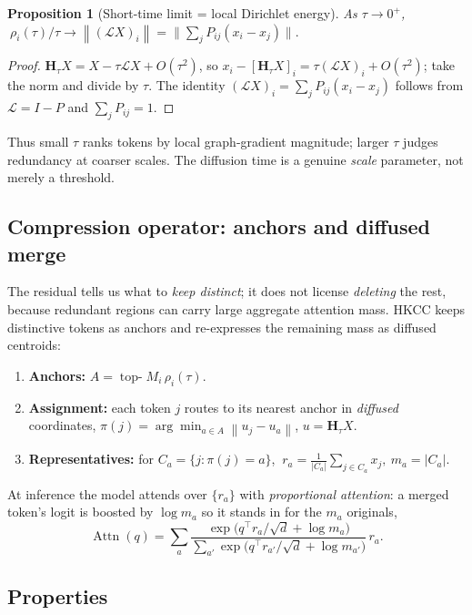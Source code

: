 \documentclass[11pt]{article}
\newtheorem{proposition}{Proposition}
\newcommand{\rwL}{\mathcal{L}}
\newcommand{\Hop}{\mathbf{H}}
\newcommand{\norm}[1]{\left\lVert#1\right\rVert}
\begin{document}
\begin{proposition}[Short-time limit = local Dirichlet energy]
\label{prop:shorttime}
As $\tau\to 0^+$, $\ \rho_i(\tau)/\tau \to \norm{(\rwL X)_i} = \big\lVert\sum_j P_{ij}(x_i-x_j)\big\rVert.$
\end{proposition}
\begin{proof}
$\Hop_\tau X = X-\tau\rwL X+O(\tau^2)$, so $x_i-[\Hop_\tau X]_i=\tau(\rwL X)_i+O(\tau^2)$;
take the norm and divide by $\tau$. The identity $(\rwL X)_i=\sum_j P_{ij}(x_i-x_j)$ follows from
$\rwL=I-P$ and $\sum_jP_{ij}=1$.
\end{proof}
\noindent
Thus small $\tau$ ranks tokens by local graph-gradient magnitude; larger $\tau$ judges redundancy
at coarser scales. The diffusion time is a genuine \emph{scale} parameter, not merely a threshold.

\subsection{Compression operator: anchors and diffused merge}
\label{sec:op}
The residual tells us what to \emph{keep distinct}; it does not license \emph{deleting} the rest,
because redundant regions can carry large aggregate attention mass. HKCC keeps distinctive tokens
as anchors and re-expresses the remaining mass as diffused centroids:
\begin{enumerate}
\item \textbf{Anchors:} $A=\operatorname{top\text{-}}M_i\,\rho_i(\tau)$.
\item \textbf{Assignment:} each token $j$ routes to its nearest anchor in \emph{diffused}
coordinates, $\pi(j)=\arg\min_{a\in A}\norm{u_j-u_a}$, $u=\Hop_\tau X$.
\item \textbf{Representatives:} for $C_a=\{j:\pi(j)=a\}$,
$\ r_a=\tfrac{1}{|C_a|}\sum_{j\in C_a}x_j,\ m_a=|C_a|.$
\end{enumerate}
At inference the model attends over $\{r_a\}$ with \emph{proportional attention}: a merged
token's logit is boosted by $\log m_a$ so it stands in for the $m_a$ originals,
\begin{equation}
\label{eq:propattn}
\operatorname{Attn}(q)=\sum_{a}\frac{\exp\!\big(q^\top r_a/\sqrt{d}+\log m_a\big)}
{\sum_{a'}\exp\!\big(q^\top r_{a'}/\sqrt{d}+\log m_{a'}\big)}\,r_a .
\end{equation}

\subsection{Properties}
\end{document}
